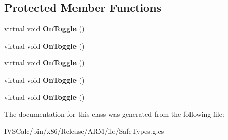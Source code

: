 \subsection*{Protected Member Functions}
\begin{DoxyCompactItemize}
\item 
\mbox{\label{class_windows_1_1_u_i_1_1_xaml_1_1_controls_1_1_primitives_1_1_toggle_button_a246727e7d02e2fd0fab6b794446b19e1}} 
virtual void {\bfseries On\+Toggle} ()
\item 
\mbox{\label{class_windows_1_1_u_i_1_1_xaml_1_1_controls_1_1_primitives_1_1_toggle_button_a246727e7d02e2fd0fab6b794446b19e1}} 
virtual void {\bfseries On\+Toggle} ()
\item 
\mbox{\label{class_windows_1_1_u_i_1_1_xaml_1_1_controls_1_1_primitives_1_1_toggle_button_a246727e7d02e2fd0fab6b794446b19e1}} 
virtual void {\bfseries On\+Toggle} ()
\item 
\mbox{\label{class_windows_1_1_u_i_1_1_xaml_1_1_controls_1_1_primitives_1_1_toggle_button_a246727e7d02e2fd0fab6b794446b19e1}} 
virtual void {\bfseries On\+Toggle} ()
\item 
\mbox{\label{class_windows_1_1_u_i_1_1_xaml_1_1_controls_1_1_primitives_1_1_toggle_button_a246727e7d02e2fd0fab6b794446b19e1}} 
virtual void {\bfseries On\+Toggle} ()
\end{DoxyCompactItemize}


The documentation for this class was generated from the following file\+:\begin{DoxyCompactItemize}
\item 
I\+V\+S\+Calc/bin/x86/\+Release/\+A\+R\+M/ilc/Safe\+Types.\+g.\+cs\end{DoxyCompactItemize}
